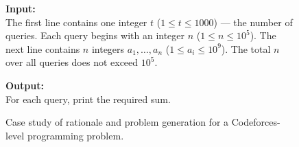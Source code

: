 \begin{figure}[htb]
{\begin{minipage}{0.99\textwidth}
            \vspace{0.5em}
            \textbf{Input:} \\
            The first line contains one integer $t$ ($1 \leq t \leq 1000$) — the number of queries. Each query begins with an integer $n$ ($1 \leq n \leq 10^5$). The next line contains $n$ integers $a_1,\dots,a_n$ ($1 \leq a_i \leq 10^9$). The total $n$ over all queries does not exceed $10^5$.

            \vspace{0.5em}
            \textbf{Output:} \\
            For each query, print the required sum.

        \end{minipage}%
    }
    \caption{Case study of rationale and problem generation for a Codeforces-level programming problem.}
    \label{fig:case_study_rationale3}
\end{figure}



